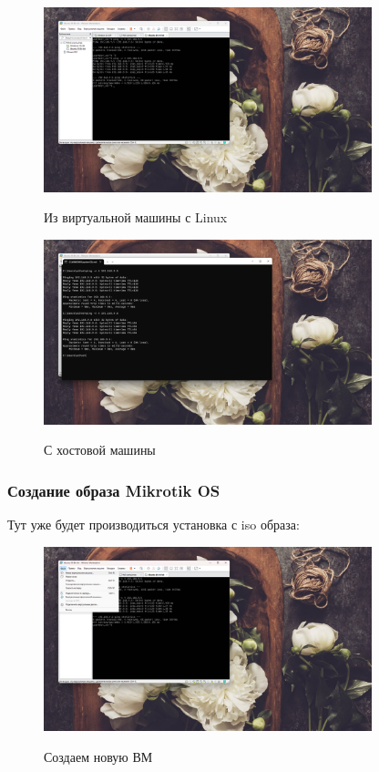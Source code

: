 \documentclass[a4paper]{article}
\begin{document}
  \begin{figure}[H]
    \centering
    \includegraphics[width=0.85\textwidth]{06_00 (73)}
    \label{img:73}
    \caption{Из виртуальной машины с Linux}
  \end{figure}
  
  \begin{figure}[H]
    \centering
    \includegraphics[width=0.85\textwidth]{06_00 (74)}
    \label{img:74}
    \caption{С хостовой машины}
  \end{figure}
  
  \subsubsection{Создание образа Mikrotik OS}

  Тут уже будет производиться установка с iso образа:

  \begin{figure}[H]
    \centering
    \includegraphics[width=0.85\textwidth]{06_00 (75)}
    \label{img:75}
    \caption{Создаем новую ВМ}
  \end{figure}
  
\end{document}
